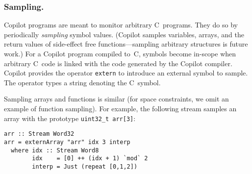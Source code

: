 \subsubsection{Sampling.}
Copilot programs are meant to monitor arbitrary C~programs.  They do
so by
periodically \emph{sampling} symbol values. (Copilot samples variables, arrays,
and the return values of side-effect free functions---sampling arbitrary
structures is future work.)  For a Copilot program compiled to~C, symbols become
in-scope when arbitrary C~code is linked with the code generated by the Copilot
compiler.  Copilot provides the operator {\tt extern} to introduce an external
symbol to sample.  The operator types a string denoting the C~symbol.



%
%

Sampling arrays and functions is similar (for space constraints, we omit an
example of function sampling).  For example, the following stream samples an
array with the prototype {\tt uint32\_t arr[3]}:
%
\begin{lstlisting}[frame=single]
arr :: Stream Word32
arr = externArray "arr" idx 3 interp
  where idx :: Stream Word8
        idx    = [0] ++ (idx + 1) `mod` 2
        interp = Just (repeat [0,1,2])
\end{lstlisting}

%
%


